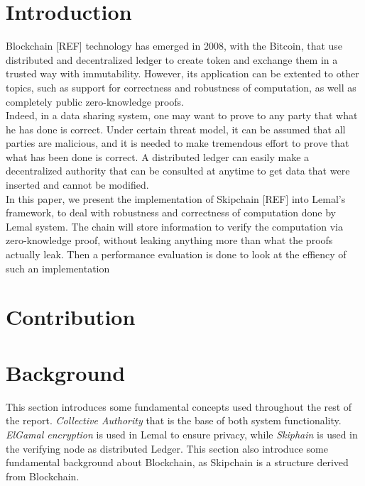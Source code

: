\documentclass{article}
\begin{document}
\newpage

\tableofcontents

\newpage

\section{Introduction}
Blockchain [REF] technology has emerged in 2008, with the Bitcoin, that use distributed and decentralized ledger to create token and exchange them in a trusted way with immutability. However, its application can be extented to other topics, such as support for correctness and robustness of computation, as well as completely public zero-knowledge proofs.\\
Indeed, in a data sharing system, one may want to prove to any party that what he has done is correct. Under certain threat model, it can be assumed that all parties are malicious, and it is needed to make tremendous effort to prove that what has been done is correct. A distributed ledger can easily make a decentralized authority that can be consulted at anytime to get data that were inserted and cannot be modified.\\
In this paper, we present the implementation of Skipchain [REF] into Lemal's framework, to deal with robustness and correctness of computation done by Lemal system. The chain will store information to verify the computation via zero-knowledge proof, without leaking anything more than what the proofs actually leak. Then a performance evaluation is done to look at the effiency of such an implementation


\section{Contribution}
\section{Background}
This section introduces some fundamental concepts used throughout the rest of the report. \textit{Collective Authority} that is the base of both system functionality. \textit{ElGamal encryption} is used in Lemal to ensure privacy, while \textit{Skiphain} is used in the verifying node as distributed Ledger. This section also introduce some fundamental background about Blockchain, as Skipchain is a structure derived from Blockchain.
\end{document}
